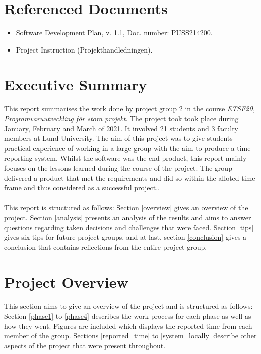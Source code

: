 \documentclass{article}
\begin{document}
\section{Referenced Documents \label{refs}}
    \begin{itemize}
        \item Software Development Plan, v. 1.1, Doc. number: PUSS214200.
        \item \label{PH} Project Instruction (Projekthandledningen).
    \end{itemize}

\newpage

\section{Executive Summary}
    This report summarises the work done by project group 2 in the course \emph{ETSF20, Programvaruutveckling för stora projekt}. The project took took place during January, February and March of 2021. It involved 21 students and 3 faculty members at Lund University. The aim of this project was to give students practical experience of working in a large group with the aim to produce a time reporting system. Whilst the software was the end product, this report mainly focuses on the lessons learned during the course of the project. The group delivered a product that met the requirements and did so within the alloted time frame
    and thus considered as a successful project..
    \\ \\
    This report is structured as follows: Section \ref{overview} gives an overview of the
    project. Section \ref{analysis} presents an analysis of the results and aims to answer questions regarding taken decisions and challenges that were faced. Section \ref{tips} gives six tips for future project groups, and at last, section \ref{conclusion} gives a conclusion
    that contains reflections from the entire project group.

\section{Project Overview \label{overview}}
    This section aims to give an overview of the project and is structured as follows:
    Section \ref{phase1} to \ref{phase4} describes the work process for each phase as well as how they went. Figures are included which displays the reported time from each member of the group. Sections \ref{reported_time} to \ref{system_locally} describe other aspects of the project that were present throughout.
    
\end{document}

